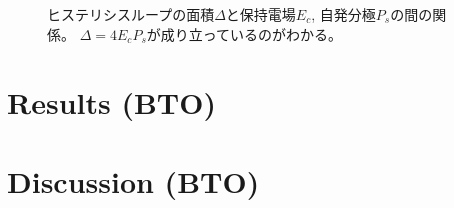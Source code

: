 \documentclass[11pt,dvipdfmx,a4paper]{jsarticle}
\begin{document}
\begin{figure}[H]
\begin{minipage}[t]{0.48\columnwidth}
        \caption{\small{ヒステリシスループの面積\(\Delta\)と保持電場\(E_c\), 自発分極\(P_s\)の間の関係。
        \(\Delta=4E_cP_s\)が成り立っているのがわかる。}}
        \label{graph:TGS_Delta-E}
    \end{minipage}
\end{figure}



\section{Results (BTO)}

\section{Discussion (BTO)}
\end{document}
